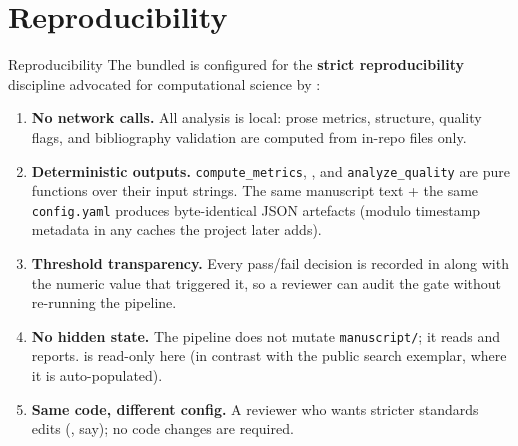 \documentclass[
  ignorenonframetext,
]{beamer}
\author{\texorpdfstring{}{}}
\date{}
\providecommand{\tightlist}{%
  \setlength{\itemsep}{0pt}\setlength{\parskip}{0pt}}
\begin{document}
\section{Reproducibility}\label{sec:reproducibility}

\begin{frame}{Reproducibility}
The bundled  is configured for the
\textbf{strict reproducibility} discipline advocated for computational
science by :

\begin{enumerate}
\tightlist
\item
  \textbf{No network calls.} All analysis is local: prose metrics,
  structure, quality flags, and bibliography validation are computed
  from in-repo files only.
\item
  \textbf{Deterministic outputs.} \texttt{compute\_metrics},
  , and \texttt{analyze\_quality} are pure
  functions over their input strings. The same manuscript text + the
  same \texttt{config.yaml} produces byte-identical JSON artefacts
  (modulo timestamp metadata in any caches the project later adds).
\item
  \textbf{Threshold transparency.} Every pass/fail decision is recorded
  in  along with the numeric value that
  triggered it, so a reviewer can audit the gate without re-running the
  pipeline.
\item
  \textbf{No hidden state.} The pipeline does not mutate
  \texttt{manuscript/}; it reads and reports.
   is read-only here (in contrast with
  the public search exemplar, where it is auto-populated).
\item
  \textbf{Same code, different config.} A reviewer who wants stricter
  standards edits 
  (, say); no code
  changes are required.
\end{enumerate}
\end{frame}
\end{document}

